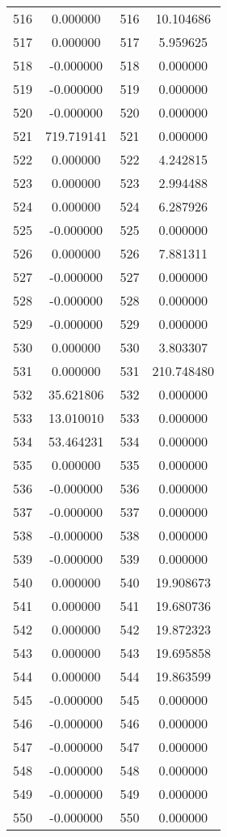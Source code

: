 \documentclass[12pt]{article}
\begin{document}
\begin{longtable}{@{}cccc@{}}
516 & 0.000000 & 516 & 10.104686 \\
517 & 0.000000 & 517 & 5.959625 \\
518 & -0.000000 & 518 & 0.000000 \\
519 & -0.000000 & 519 & 0.000000 \\
520 & -0.000000 & 520 & 0.000000 \\
521 & 719.719141 & 521 & 0.000000 \\
522 & 0.000000 & 522 & 4.242815 \\
523 & 0.000000 & 523 & 2.994488 \\
524 & 0.000000 & 524 & 6.287926 \\
525 & -0.000000 & 525 & 0.000000 \\
526 & 0.000000 & 526 & 7.881311 \\
527 & -0.000000 & 527 & 0.000000 \\
528 & -0.000000 & 528 & 0.000000 \\
529 & -0.000000 & 529 & 0.000000 \\
530 & 0.000000 & 530 & 3.803307 \\
531 & 0.000000 & 531 & 210.748480 \\
532 & 35.621806 & 532 & 0.000000 \\
533 & 13.010010 & 533 & 0.000000 \\
534 & 53.464231 & 534 & 0.000000 \\
535 & 0.000000 & 535 & 0.000000 \\
536 & -0.000000 & 536 & 0.000000 \\
537 & -0.000000 & 537 & 0.000000 \\
538 & -0.000000 & 538 & 0.000000 \\
539 & -0.000000 & 539 & 0.000000 \\
540 & 0.000000 & 540 & 19.908673 \\
541 & 0.000000 & 541 & 19.680736 \\
542 & 0.000000 & 542 & 19.872323 \\
543 & 0.000000 & 543 & 19.695858 \\
544 & 0.000000 & 544 & 19.863599 \\
545 & -0.000000 & 545 & 0.000000 \\
546 & -0.000000 & 546 & 0.000000 \\
547 & -0.000000 & 547 & 0.000000 \\
548 & -0.000000 & 548 & 0.000000 \\
549 & -0.000000 & 549 & 0.000000 \\
550 & -0.000000 & 550 & 0.000000 \\

\end{longtable}
\end{document}
